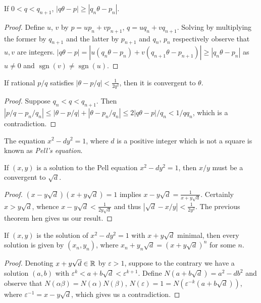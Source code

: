 \documentclass[a4paper, 10pt, twocolumn]{amsart}
\begin{document}
\begin{theorem}
  If $0 < q< q_{n + 1}$, $|q \theta - p| \geq |q_n \theta - p_n|$.
\end{theorem}
\begin{proof}
  Define $u$, $v$ by $p = u p_n + v p_{n + 1}$, $q = u q_n + v q_{n + 1}$. Solving by multiplying the former by $q_{n + 1}$ and the latter by $p_{n + 1}$ and $q_n$, $p_n$ respectively observe that $u, v$ are integers. $|q \theta -  p| = |u(q_n \theta - p_n) + v(q_{n + 1} \theta - p_{n + 1})| \geq |q_n \theta - p_n|$ as $u \neq 0$ and $\operatorname{sgn}(v) \neq \operatorname{sgn}(u)$.
\end{proof}

\begin{theorem}
  If rational $p/q$ satisfies $|\theta - p/q| < \frac{1}{2q^2}$, then it is convergent to $\theta$.
\end{theorem}
\begin{proof}
  Suppose $q_n < q< q_{n + 1}$. Then $|p/q - p_n/q_n| \leq |\theta - p/q| + |\theta - p_n /q_n| \leq 2 |q \theta - p|/q_n < 1/q q_n$, which is a contradiction.
\end{proof}

\begin{definition}
  The equation $x^2 - dy^2 = 1$, where $d$ is a positive integer which is not a square is known as \emph{Pell's equation}.
\end{definition}

\begin{theorem}
  If $(x, y)$ is a solution to the Pell equation $x^2 - dy^2 = 1$, then $x/y$ must be a convergent to $\sqrt{d}$.
\end{theorem}
\begin{proof}
  $(x - y \sqrt{d})(x + y \sqrt{d}) = 1$ implies $x - y \sqrt{d} = \frac{1}{x + y \sqrt{d}}$. Certainly $x > y \sqrt{d}$, whence $x - y \sqrt{d} < \frac{1}{2y \sqrt{d}}$ and thus $|\sqrt{d} - x/y| < \frac{1}{2y^2}$. The previous theorem hen gives us our result.
\end{proof}

\begin{theorem}
  If $(x, y)$ is the solution of $x^2 - dy^2 = 1$ with $x + y \sqrt{d}$ minimal, then every solution is given by $(x_n, y_n)$, where $x_n + y_n \sqrt{d} = (x + y \sqrt{d})^n$ for some $n$.
\end{theorem}
\begin{proof}
  Denoting $x + y \sqrt{d} \in \mathbb{R}$ by $\varepsilon > 1$, suppose to the contrary we have a solution $(a, b)$ with $\varepsilon^k < a + b \sqrt{d} < \varepsilon^{k + 1}$. Define $N(a + b\sqrt{d}) = a^2 - db^2$ and observe that $N(\alpha \beta) = N(\alpha)N(\beta)$, $N(\varepsilon) = 1 = N(\varepsilon^{-k}(a + b \sqrt{d}))$, where $\varepsilon^{-1} = x - y \sqrt{d}$, which gives us a contradiction.
\end{proof}
\end{document}
